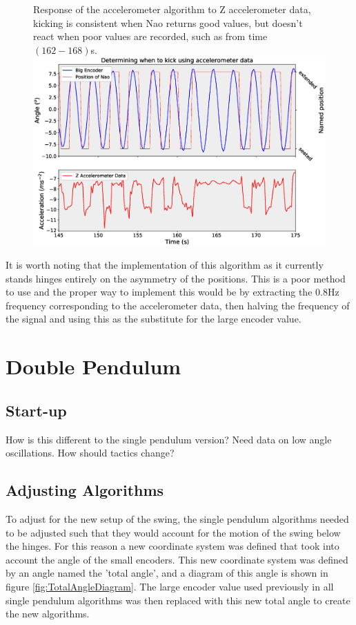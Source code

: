\documentclass[11pt]{article}
\newcommand*\ruleline[1]{\par\noindent\raisebox{.8ex}{\makebox[\linewidth]{\hrulefill\hspace{1ex}\raisebox{-.8ex}{#1}\hspace{1ex}\hrulefill}}}
\begin{document}
    \begin{figure}[!htb]
        \centering
        \captionbox
             {Response of the accelerometer algorithm to Z accelerometer data, kicking is consistent when Nao returns good values, but doesn't react when poor values are recorded, such as from time $(162-168)$s.\label{fig:PositionAccelerometer}}
             {\includegraphics[width=1.0\textwidth]{PositionAccelerometer.eps}}
    \end{figure}
    
It is worth noting that the implementation of this algorithm as it currently stands hinges entirely on the asymmetry of the positions. This is a poor method to use and the proper way to implement this would be by extracting the $0.8$Hz frequency corresponding to the accelerometer data, then halving the frequency of the signal and using this as the substitute for the large encoder value.

\clearpage

\section{Double Pendulum}
\subsection{Start-up}
\ruleline{James Doering}
How is this different to the single pendulum version? Need data on low angle oscillations. How should tactics change?

\subsection{Adjusting Algorithms}\label{sec:AdjustingAlgorithms}
\ruleline{George Sheppard}
To adjust for the new setup of the swing, the single pendulum algorithms needed to be adjusted such that they would account for the motion of the swing below the hinges. For this reason a new coordinate system was defined that took into account the angle of the small encoders. This new coordinate system was defined by an angle named the 'total angle', and a diagram of this angle is shown in figure \ref{fig:TotalAngleDiagram}. The large encoder value used previously in all single pendulum algorithms was then replaced with this new total angle to create the new algorithms.
\end{document}
